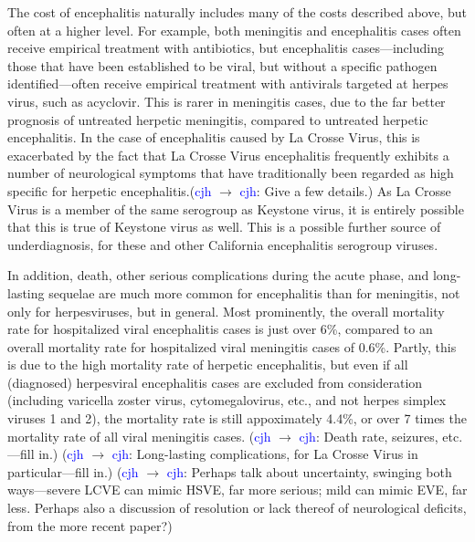 \documentclass[12pt]{article}
\newcommand{\cjh}{\textcolor{blue}{cjh}}
\newcommand{\msg}[3]{(#1 $\rightarrow$ #2: #3)}
\newcommand{\mcc}[1]{\msg\cjh\cjh{#1}}
\begin{document}
            The cost of encephalitis naturally includes many of the costs described above, but often at a higher level. For example, both meningitis and encephalitis cases often receive empirical treatment with antibiotics, but encephalitis cases---including those that have been established to be viral, but without a specific pathogen identified---often receive empirical treatment with antivirals targeted at herpes virus, such as acyclovir. This is rarer in meningitis cases, due to the far better prognosis of untreated herpetic meningitis, compared to untreated herpetic encephalitis. In the case of encephalitis caused by La Crosse Virus, this is exacerbated by the fact that La Crosse Virus encephalitis frequently exhibits a number of neurological symptoms that have traditionally been regarded as high specific for herpetic encephalitis.\mcc{Give a few details.} As La Crosse Virus is a member of the same serogroup as Keystone virus, it is entirely possible that this is true of Keystone virus as well. This is a possible further source of underdiagnosis, for these and other California encephalitis serogroup viruses.


            In addition, death, other serious complications during the acute phase, and long-lasting sequelae are much more common for encephalitis than for meningitis, not only for herpesviruses, but in general. Most prominently, the overall mortality rate for hospitalized viral encephalitis cases is just over 6\%\cite{george2014encephalitis}, compared to an overall mortality rate for hospitalized viral meningitis cases of 0.6\%\cite{holmquist2008meningitis}. Partly, this is due to the high mortality rate of herpetic encephalitis, but even if all (diagnosed) herpesviral encephalitis cases are excluded from consideration (including varicella zoster virus, cytomegalovirus, etc., and not herpes simplex viruses 1 and 2), the mortality rate is still appoximately 4.4\%, or over 7 times the mortality rate of all viral meningitis cases.
            \mcc{Death rate, seizures, etc.---fill in.} \mcc{Long-lasting complications, for La Crosse Virus in particular---fill in.} \mcc{Perhaps talk about uncertainty, swinging both ways---severe LCVE can mimic HSVE, far more serious; mild can mimic EVE, far less. Perhaps also a discussion of resolution or lack thereof of neurological deficits, from the more recent paper?}
\end{document}
